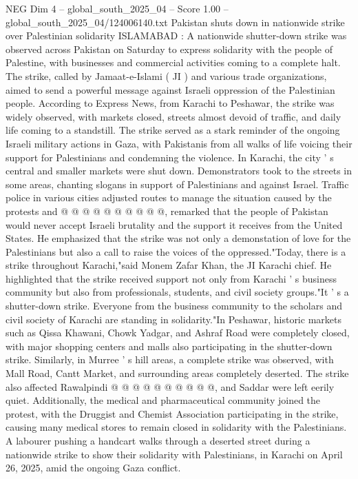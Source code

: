 \begin{textsample}{NEG Dim 4 – global\_south\_2025\_04 – Score 1.00 – global\_south\_2025\_04/124006140.txt}  \label{ex:f4_neg_237}
Pakistan shuts down in nationwide strike over Palestinian solidarity ISLAMABAD : A nationwide shutter-down strike was observed across Pakistan on Saturday to express solidarity with the people of Palestine, with businesses and commercial activities coming to a complete halt.
The strike, called by Jamaat-e-Islami ( JI ) and various trade organizations, aimed to send a powerful message against Israeli oppression of the Palestinian people.
According to Express News, from Karachi to Peshawar, the strike was widely observed, with markets closed, streets almost devoid of traffic, and daily life coming to a standstill.
The strike served as a stark reminder of the ongoing Israeli military actions in Gaza, with Pakistanis from all walks of life voicing their support for Palestinians and condemning the violence.
In Karachi, the city ' s central and smaller markets were shut down.
Demonstrators took to the streets in some areas, chanting slogans in support of Palestinians and against Israel.
Traffic police in various cities adjusted routes to manage the situation caused by the protests and @ @ @ @ @ @ @ @ @ @, remarked that the people of Pakistan would never accept Israeli brutality and the support it receives from the United States.
He emphasized that the strike was not only a demonstation of love for the Palestinians but also a call to raise the voices of the oppressed."Today, there is a strike throughout Karachi,"said Monem Zafar Khan, the JI Karachi chief.
He highlighted that the strike received support not only from Karachi ' s business community but also from professionals, students, and civil society groups."It ' s a shutter-down strike.
Everyone from the business community to the scholars and civil society of Karachi are standing in solidarity."In Peshawar, historic markets such as Qissa Khawani, Chowk Yadgar, and Ashraf Road were completely closed, with major shopping centers and malls also participating in the shutter-down strike.
Similarly, in Murree ' s hill areas, a complete strike was observed, with Mall Road, Cantt Market, and surrounding areas completely deserted.
The strike also affected Rawalpindi @ @ @ @ @ @ @ @ @ @, and Saddar were left eerily quiet.
Additionally, the medical and pharmaceutical community joined the protest, with the Druggist and Chemist Association participating in the strike, causing many medical stores to remain closed in solidarity with the Palestinians.
A labourer pushing a handcart walks through a deserted street during a nationwide strike to show their solidarity with Palestinians, in Karachi on April 26, 2025, amid the ongoing Gaza conflict.

\end{textsample}
